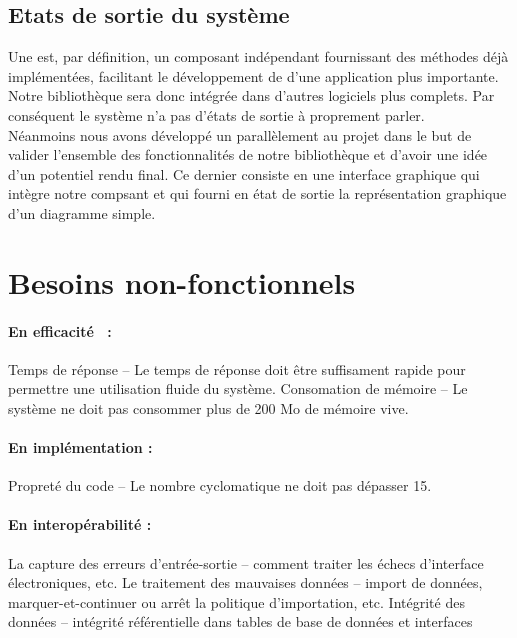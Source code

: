 \documentclass[12pt,a4paper,openany]{report}
\begin{document}
	\subsection{Etats de sortie du système}
	Une  
	est, par définition, un composant indépendant fournissant des méthodes déjà implémentées, facilitant le développement de d'une application plus importante. Notre bibliothèque sera donc intégrée dans d'autres logiciels
	plus complets.  Par conséquent le système n'a pas d'états de sortie à proprement parler.\\
	Néanmoins nous avons développé un 
	parallèlement au projet dans le but de valider l'ensemble
	des fonctionnalités de notre bibliothèque et d'avoir une idée d'un potentiel rendu final.
	Ce dernier consiste en une interface graphique qui intègre notre compsant et qui fourni en 
	état de sortie la représentation graphique d'un diagramme simple.

	\section{Besoins non-fonctionnels}
		\paragraph{En efficacité~ :}
		Temps de réponse -- Le temps de réponse doit être suffisament rapide pour permettre une utilisation fluide du système.
		Consomation de mémoire -- Le système ne doit pas consommer plus de 200 Mo de mémoire vive.
		\paragraph{En implémentation :}
		Propreté du code -- Le nombre cyclomatique ne doit pas dépasser 15.
		\paragraph{En interopérabilité :}
		La capture des erreurs d'entrée-sortie -- comment traiter les échecs d'interface électroniques, etc.
		Le traitement des mauvaises données -- import de données, marquer-et-continuer ou arrêt la politique d'importation, etc.
		Intégrité des données -- intégrité référentielle dans tables de base de données et interfaces
\end{document}
